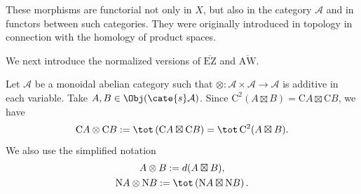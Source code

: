These morphisms are functorial not only in $X$, but also in the category
$\mathcal{A}$ and in functors between such categories. They were originally
introduced in topology in connection with the homology of product spaces.

We next introduce the normalized versions of $\overline{\mathrm{EZ}}$ and
$\overline{\mathrm{AW}}$.

Let $\mathcal{A}$ be a monoidal abelian category such that
$\otimes:\mathcal{A}\times\mathcal{A}\to\mathcal{A}$ is additive in each
variable. Take $A,B\in\Obj(\cate{s}\mathcal{A})$. Since
$\mathrm{C}^2(A\boxtimes B)=\mathrm{C}A\boxtimes\mathrm{C}B$, we have
\[ \mathrm{C}A \otimes \mathrm{C}B := \tot\left( \mathrm{C}A \boxtimes \mathrm{C}B \right) = \tot \, \mathrm{C}^2 (A \boxtimes B). \]
We also use the simplified notation
\begin{gather*}
	A \otimes B := d(A \boxtimes B), \\
	\mathrm{N}A \otimes \mathrm{N}B := \tot\left( \mathrm{N}A \boxtimes \mathrm{N}B \right).
\end{gather*}

